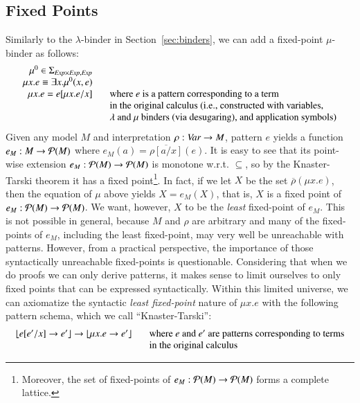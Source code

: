 \documentclass[UTF8,11pt]{article}
\theoremstyle{plain}
\theoremstyle{definition}
\theoremstyle{remark}
\DeclarePairedDelimiter{\floor}{\lfloor}{\rfloor}
\newcommand{\Exp}{\textit{Exp}}
\newcommand{\ra}{\rightarrow}
\begin{document}
\subsection{Fixed Points}
\label{sec:fixed-points}

Similarly to the $\lambda$-binder in Section~\ref{sec:binders}, we can
add a fixed-point $\mu$-binder as follows:
$$
\begin{array}{r@{\hspace*{4ex}}l}
\mu^0 \in \Sigma_{\Exp\times\Exp,\Exp}
\\
\mu x . e \equiv \exists x . \mu^0(x,e)
\\
\mu x . e = e[\mu x.e/x]
& \textrm{where $e$ is a pattern corresponding to a term}
\\
& \textrm{in the original calculus (i.e., constructed with variables,}
\\
& \textrm{$\lambda$ and $\mu$ binders (via desugaring), and application
symbols)}
\end{array}
$$
Given any model $M$ and interpretation $\rho : \Var \ra M$, pattern $e$
yields a function $e_M : M \rightarrow {\cal P}(M)$ where
$e_M(a) = \overline{\rho[a/x]}(e)$.
It is easy to see that its point-wise extension
$e_M : {\cal P}(M) \rightarrow {\cal P}(M)$ is monotone w.r.t. $\subseteq$,
so by the Knaster-Tarski theorem it has a fixed point\footnote{
Moreover, the set of fixed-points of
$e_M : {\cal P}(M) \rightarrow {\cal P}(M)$ forms a complete lattice.}.
In fact, if we let $X$ be the set $\overline{\rho}(\mu x . e)$, then
the equation of $\mu$ above yields $X = e_M(X)$, that is, $X$ is a fixed point
of $e_M : {\cal P}(M) \rightarrow {\cal P}(M)$.
%
We want, however, $X$ to be the \emph{least} fixed-point of $e_M$.
This is not possible in general, because $M$ and $\rho$ are arbitrary
and many of the fixed-points of $e_M$, including the least fixed-point,
may very well be unreachable with patterns.
However, from a practical perspective, the importance of those syntactically
unreachable fixed-points is questionable.
Considering that when we do proofs we can only derive patterns, it makes
sense to limit ourselves to only fixed points that can be expressed
syntactically.
Within this limited universe, we can axiomatize the syntactic
\emph{least fixed-point} nature of $\mu x . e$ with the following
pattern schema, which we call ``Knaster-Tarski'':
$$
\begin{array}{r@{\hspace*{4ex}}l}
\floor{e[e'/x] \rightarrow e'} \rightarrow \floor{\mu x . e \rightarrow e'}
& \textrm{where $e$ and $e'$ are patterns corresponding to terms}
\\
& \textrm{in the original calculus}
\end{array}
$$
\end{document}
